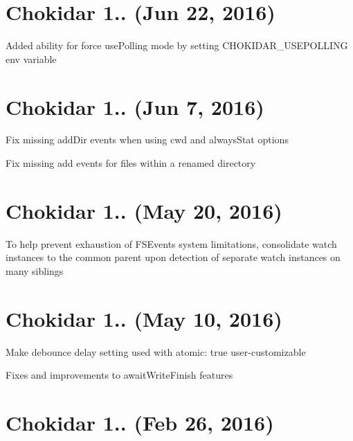 \section*{Chokidar 1.. (Jun 22, 2016)}


\begin{DoxyItemize}
\item Added ability for force {\ttfamily use\+Polling} mode by setting {\ttfamily C\+H\+O\+K\+I\+D\+A\+R\+\_\+\+U\+S\+E\+P\+O\+L\+L\+I\+NG} env variable
\end{DoxyItemize}

\section*{Chokidar 1.. (Jun 7, 2016)}


\begin{DoxyItemize}
\item Fix missing {\ttfamily add\+Dir} events when using {\ttfamily cwd} and {\ttfamily always\+Stat} options
\item Fix missing {\ttfamily add} events for files within a renamed directory
\end{DoxyItemize}

\section*{Chokidar 1.. (May 20, 2016)}


\begin{DoxyItemize}
\item To help prevent exhaustion of F\+S\+Events system limitations, consolidate watch instances to the common parent upon detection of separate watch instances on many siblings
\end{DoxyItemize}

\section*{Chokidar 1.. (May 10, 2016)}


\begin{DoxyItemize}
\item Make debounce delay setting used with {\ttfamily atomic\+: true} user-\/customizable
\item Fixes and improvements to {\ttfamily await\+Write\+Finish} features
\end{DoxyItemize}

\section*{Chokidar 1.. (Feb 26, 2016)}


